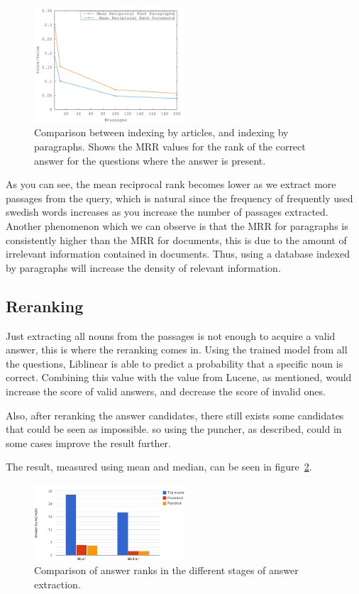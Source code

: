 \begin{figure}[h!]
  \centering
  \includegraphics[width=0.5\textwidth]{figures/median.pdf}
  \caption{Comparison between indexing by articles, and indexing by paragraphs. 
  Shows the MRR values for the rank of the correct answer for the questions where 
  the answer is present.}
  \label{fig:median}
\end{figure}

As you can see, the mean reciprocal rank becomes lower as we extract more passages from the query, which
is natural since the frequency of frequently used swedish words increases as you increase the number
of passages extracted. Another phenomenon which we can observe is that the MRR for 
paragraphs is consistently higher than the MRR for documents, this is due to the amount of irrelevant
information contained in documents. Thus, using a database indexed by paragraphs will increase 
the density of relevant information. 

\subsection{Reranking}
Just extracting all nouns from the passages is not enough to acquire a valid answer, this is where the reranking comes in.
Using the trained model from all the questions, Liblinear is able to predict a probability that a specific noun is correct.
Combining this value with the value from Lucene, as mentioned, would increase the score of valid answers, and decrease the score of invalid ones.

Also, after reranking the answer candidates, there still exists some candidates that could be seen as impossible.
so using the puncher, as described, could in some cases improve the result further.

The result, measured using mean and median, can be seen in figure~\ref{fig:meanmedian}.

\begin{figure}[h!]
  \centering
  \hspace*{-0.6cm}
  \includegraphics[width=0.5\textwidth]{figures/meanMedian.png}
  \caption{Comparison of answer ranks in the different stages of answer extraction.}
  \label{fig:meanmedian}
\end{figure}

